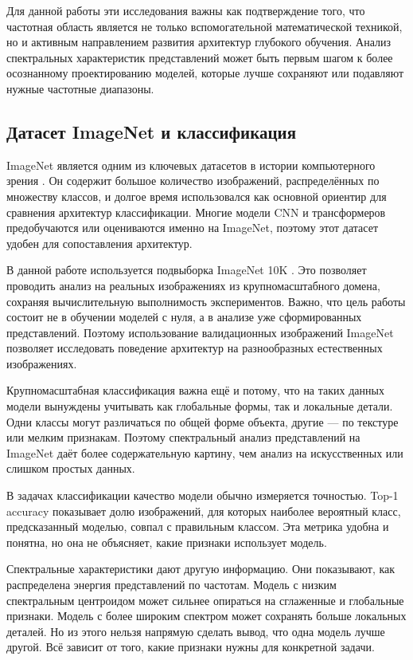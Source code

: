 Для данной работы эти исследования важны как подтверждение того, что частотная область является не только вспомогательной математической техникой, но и активным направлением развития архитектур глубокого обучения. Анализ спектральных характеристик представлений может быть первым шагом к более осознанному проектированию моделей, которые лучше сохраняют или подавляют нужные частотные диапазоны.

\subsection{Датасет ImageNet и классификация}

ImageNet является одним из ключевых датасетов в истории компьютерного зрения \cite{deng2009imagenet}. Он содержит большое количество изображений, распределённых по множеству классов, и долгое время использовался как основной ориентир для сравнения архитектур классификации. Многие модели CNN и трансформеров предобучаются или оцениваются именно на ImageNet, поэтому этот датасет удобен для сопоставления архитектур.

В данной работе используется подвыборка ImageNet 10K \cite{priyerana_imagenet10k}. Это позволяет проводить анализ на реальных изображениях из крупномасштабного домена, сохраняя вычислительную выполнимость экспериментов. Важно, что цель работы состоит не в обучении моделей с нуля, а в анализе уже сформированных представлений. Поэтому использование валидационных изображений ImageNet позволяет исследовать поведение архитектур на разнообразных естественных изображениях.

Крупномасштабная классификация важна ещё и потому, что на таких данных модели вынуждены учитывать как глобальные формы, так и локальные детали. Одни классы могут различаться по общей форме объекта, другие — по текстуре или мелким признакам. Поэтому спектральный анализ представлений на ImageNet даёт более содержательную картину, чем анализ на искусственных или слишком простых данных.


В задачах классификации качество модели обычно измеряется точностью. Top-1 accuracy показывает долю изображений, для которых наиболее вероятный класс, предсказанный моделью, совпал с правильным классом. Эта метрика удобна и понятна, но она не объясняет, какие признаки использует модель.

Спектральные характеристики дают другую информацию. Они показывают, как распределена энергия представлений по частотам. Модель с низким спектральным центроидом может сильнее опираться на сглаженные и глобальные признаки. Модель с более широким спектром может сохранять больше локальных деталей. Но из этого нельзя напрямую сделать вывод, что одна модель лучше другой. Всё зависит от того, какие признаки нужны для конкретной задачи.

